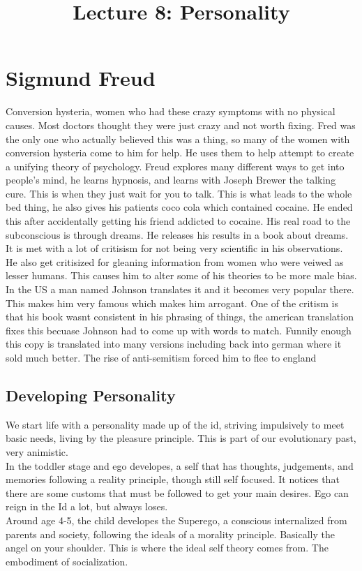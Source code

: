 \documentclass{article}
\title{Lecture 8: Personality}
\begin{document}
\section*{Sigmund Freud}
Conversion hysteria, women who had these crazy symptoms with no physical causes. Most doctors thought they were just crazy and not worth fixing. Fred was the only one who actually believed this was a thing, so many of the women with conversion hysteria come to him for help. He uses them to help attempt to create a unifying theory of psychology. Freud explores many different ways to get into people's mind, he learns hypnosis, and learns with Joseph Brewer the talking cure. This is when they just wait for you to talk. This is what leads to the whole bed thing, he also gives his patients coco cola which contained cocaine. He ended this after accidentally getting his friend addicted to cocaine. His real road to the subconscious is through dreams. He releases his results in a book about dreams. It is met with a lot of critisism for not being very scientific in his observations. He also get critisized for gleaning information from women who were veiwed as lesser humans. This causes him to alter some of his theories to be more male bias. In the US a man named Johnson translates it and it becomes very popular there. This makes him very famous which makes him arrogant. One of the critism is that his book wasnt consistent in his phrasing of things, the american translation fixes this becuase Johnson had to come up with words to match. Funnily enough this copy is translated into many versions including back into german where it sold much better. The rise of anti-semitism forced him to flee to england
\subsection*{Developing Personality}
We start life with a personality made up of the id, striving impulsively to meet basic needs, living by the pleasure principle. This is part of our evolutionary past, very animistic. \\
In the toddler stage and ego developes, a self that has thoughts, judgements, and memories following a reality principle, though still self focused. It notices that there are some customs that must be followed to get your main desires. Ego can reign in the Id a lot, but always loses.\\
Around age 4-5, the child developes the Superego, a conscious internalized from parents and society, following the ideals of a morality principle. Basically the angel on your shoulder. This is where the ideal self theory comes from. The embodiment of socialization. 
\end{document}
